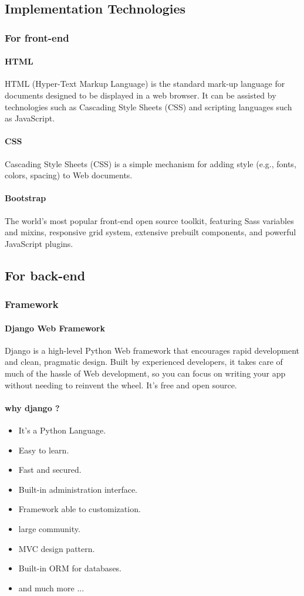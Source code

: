 \documentclass[12pt,a4paper]{article}
\begin{document}
	\subsection{Implementation Technologies}
	\subsubsection{For front-end}
	\paragraph{HTML}
	HTML (Hyper-Text Markup Language) is the standard mark-up language for documents designed to be displayed in a web browser. It can be assisted by technologies such as Cascading Style Sheets (CSS) and scripting languages such as JavaScript.\cite{HTML}
	\paragraph{CSS}
	Cascading Style Sheets (CSS) is a simple mechanism for adding style (e.g., fonts, colors, spacing) to Web documents.\cite{CSS}
	\paragraph{Bootstrap}
	 The world’s most popular front-end open source toolkit, featuring Sass variables and mixins, responsive grid system, extensive prebuilt components, and powerful JavaScript plugins.\cite{Bootstrap}
	\subsection{For back-end}
	\subsubsection{Framework}
	\paragraph{Django Web Framework}
	Django is a high-level Python Web framework that encourages rapid development and clean, pragmatic design. Built by experienced developers, it takes care of much of the hassle of Web development, so you can focus on writing your app without needing to reinvent the wheel. It’s free and open source.\cite{Django}
	\paragraph{why django ?}
	\begin{itemize}
		\item It's a Python Language.
		\item Easy to learn.
		\item Fast and secured.
		\item Built-in administration interface.
		\item Framework able to customization.
		\item large community.
		\item MVC design pattern.
		\item Built-in ORM for databases.
		\item and much more ...
	\end{itemize}
\end{document}
